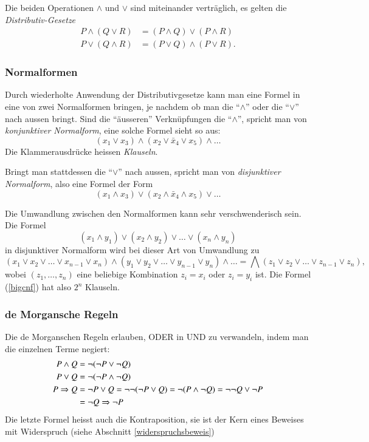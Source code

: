 Die beiden Operationen $\wedge$ und $\vee$ sind miteinander verträglich,
es gelten die {\em Distributiv-Gesetze}
\begin{align*}
P\wedge(Q\vee R)&=(P\wedge Q)\vee (P\wedge R)\\
P\vee(Q\wedge R)&=(P\vee Q)\wedge (P\vee R).
\end{align*}
%

\subsubsection{Normalformen}
%
%
Durch wiederholte Anwendung der Distributivgesetze kann man 
eine Formel in eine von zwei Normalformen bringen, je nachdem
ob man die ``$\wedge$'' oder die ``$\vee$'' nach aussen bringt.
Sind die ``äusseren'' Verknüpfungen die ``$\wedge$'', spricht
man von {\em konjunktiver Normalform}, eine solche Formel sieht so aus:
\[
(x_1\vee x_3)\wedge(x_2\vee \bar x_4\vee x_5)\wedge\dots
\]
Die Klammerausdrücke heissen {\em Klauseln}.
%

Bringt man stattdessen die ``$\vee$'' nach aussen, spricht man von
{\em disjunktiver Normalform}, also eine Formel der Form
%
\[
(x_1\wedge x_3)\vee(x_2\wedge \bar x_4\wedge x_5)\vee\dots
\]

Die Umwandlung zwischen den Normalformen kann sehr verschwenderisch sein.
Die Formel
\[
(x_1\wedge y_1)\vee(x_2\wedge y_2)\vee\dots\vee (x_n\wedge y_n)
\]
in disjunktiver Normalform wird bei dieser Art von Umwandlung zu
\begin{equation}
(x_1\vee x_2\vee\dots\vee x_{n-1}\vee x_n)
\wedge
(y_1\vee y_2\vee\dots\vee y_{n-1}\vee y_n)
\wedge
\dots 
=\bigwedge (z_1\vee z_2\vee\dots \vee z_{n-1}\vee z_n),
\label{bigcnf}
\end{equation}
wobei $(z_1,\dots,z_n)$ eine beliebige Kombination $z_i=x_i$ oder $z_i=y_i$
ist. Die Formel (\ref{bigcnf}) hat also $2^n$ Klauseln.

\subsubsection{de Morgansche Regeln}
%
Die de Morganschen Regeln erlauben, ODER in UND zu verwandeln, indem
man die einzelnen Terme negiert:
\begin{align}
P\wedge Q&= \neg(\neg P\vee\neg Q)\notag\\
P\vee Q&= \neg(\neg P\wedge\neg Q)\notag\\
P\Rightarrow Q&=\neg P\vee Q=\neg\neg(\neg P\vee Q)=\neg(P\wedge\neg Q)=\neg\neg Q\vee \neg P\notag\\
&=\neg Q\Rightarrow \neg P\label{kontraposition}
\end{align}
%
Die letzte Formel heisst auch die Kontraposition, sie ist der Kern
eines Beweises mit Widerspruch (siehe Abschnitt \ref{widerspruchsbeweis})


